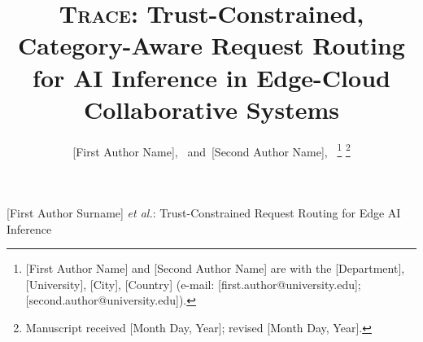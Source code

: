 \documentclass[journal]{IEEEtran}
\newcommand{\sys}{\textsc{Trace}}
\begin{document}
\title{\sys: Trust-Constrained, Category-Aware Request Routing for AI Inference in Edge-Cloud Collaborative Systems}

\author{[First Author Name],~
        and~[Second Author Name],~%
\thanks{[First Author Name] and [Second Author Name] are with the [Department], [University], [City], [Country] (e-mail: [first.author@university.edu]; [second.author@university.edu]).}%
\thanks{Manuscript received [Month Day, Year]; revised [Month Day, Year].}}

%
{[First Author Surname] \MakeLowercase{\textit{et al.}}: Trust-Constrained Request Routing for Edge AI Inference}
\maketitle
\end{document}
